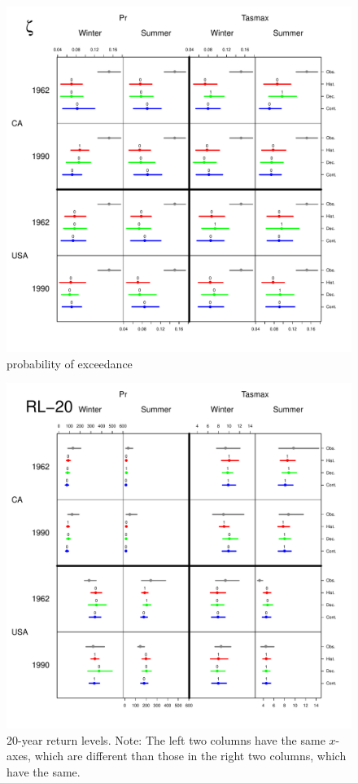 \documentclass[12pt]{article}
\begin{document}
\begin{figure}
\begin{center}
\includegraphics[scale=0.72]{figs/zeta.pdf}
\end{center}
\caption{probability of exceedance}
\label{sigma}
\end{figure}

\begin{figure}
\begin{center}
\includegraphics[scale=0.72]{figs/rl20.pdf}
\end{center}
\caption{20-year return levels. Note: The left two columns have the same $x$-axes, which are different than those in the right two columns, which have the same.}
\label{20rl}
\end{figure}
\end{document}
